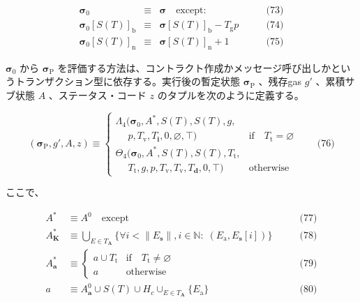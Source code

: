 \documentclass[
]{ltjsarticle}
\begin{document}
\[\begin{aligned}
\boldsymbol{\sigma}_0 & \equiv & \boldsymbol{\sigma} \quad \text{except:} & \qquad \text{(73)} \\
\boldsymbol{\sigma}_0[S(T)]_{\mathrm{b}} & \equiv & \boldsymbol{\sigma}[S(T)]_{\mathrm{b}} - T_{\mathrm{g}} p & \qquad \text{(74)} \\
\boldsymbol{\sigma}_0[S(T)]_{\mathrm{n}} & \equiv & \boldsymbol{\sigma}[S(T)]_{\mathrm{n}} + 1 & \qquad \text{(75)}
\end{aligned}\]

\(\boldsymbol{\sigma}_0\) から \(\boldsymbol{\sigma}_{\mathrm{P}}\)
を評価する方法は、コントラクト作成かメッセージ呼び出しかというトランザクション型に依存する。実行後の暫定状態
\(\boldsymbol{\sigma}_{\mathrm{P}}\) 、残存gas \(g'\) 、累積サブ状態
\(A\) 、ステータス・コード \(z\) のタプルを次のように定義する。

\protect\hypertarget{eq-76}{}{}

\[(\boldsymbol{\sigma}_{\mathrm{P}}, g', A, z) \equiv \begin{cases}
\Lambda_{4}(\boldsymbol{\sigma}_0, A^{*}, S(T), S(T), g, &\\ \quad\; p, T_{\mathrm{v}}, T_{\mathbf{i}}, 0, \varnothing, \top) & \text{if} \quad T_{\mathrm{t}} = \varnothing \\
\Theta_{4}(\boldsymbol{\sigma}_0, A^{*}, S(T), S(T), T_{\mathrm{t}}, &\\ \quad\; T_{\mathrm{t}}, g, p, T_{\mathrm{v}}, T_{\mathrm{v}}, T_{\mathbf{d}}, 0, \top) & \text{otherwise}
\end{cases} \qquad \text{(76)}\]

ここで、

\protect\hypertarget{eq-77}{}{}\protect\hypertarget{eq-78}{}{}\protect\hypertarget{eq-79}{}{}\protect\hypertarget{eq-80}{}{}

\[\begin{aligned}
A^{*} & \equiv A^0 \quad \text{except} & \qquad \text{(77)} \\
A^{*}_{\mathbf{K}} & \equiv \bigcup_{E \in T_{\mathbf{A}}} \big\{ \forall i < \lVert E_{\mathbf{s}} \rVert, i \in \mathbb{N}: \; (E_{\mathrm{a}}, E_{\mathbf{s}}[i]) \big\} & \qquad \text{(78)} \\
A^{*}_{\mathbf{a}} & \equiv \begin{cases}
a \cup T_{\mathrm{t}} & \text{if} \quad T_{\mathrm{t}} \neq \varnothing \\
a & \text{otherwise}
\end{cases} & \qquad \text{(79)} \\
a & \equiv A^0_{\mathbf{a}} \cup S(T) \cup H_c \cup_{E \in T_{\mathbf{A}}} \{ E_{\mathrm{a}} \} & \qquad \text{(80)}
\end{aligned}\]
\end{document}

